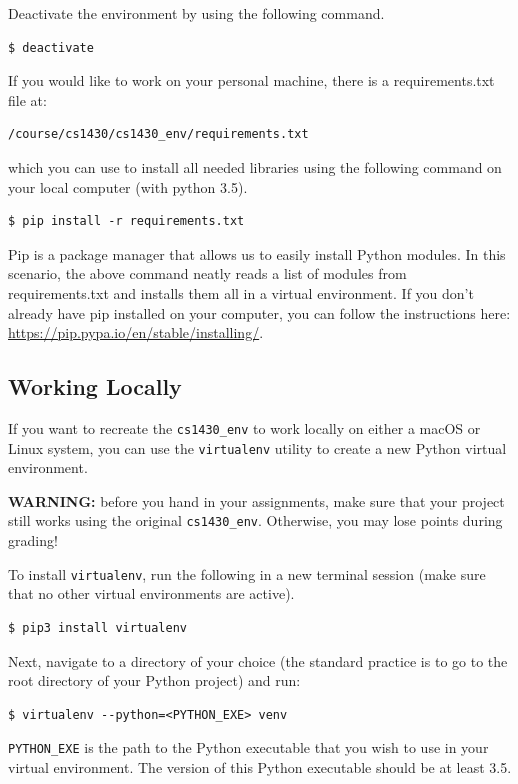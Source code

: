 \documentclass{article}
\begin{document}
Deactivate the environment by using the following command. 
\begin{verbatim}
$ deactivate
\end{verbatim}

If you would like to work on your personal machine, there is a requirements.txt file at: 
\begin{verbatim}
/course/cs1430/cs1430_env/requirements.txt
\end{verbatim} 
which you can use to install all needed libraries using the following command on your local computer (with python 3.5). 
\begin{verbatim}
$ pip install -r requirements.txt
\end{verbatim}

Pip is a package manager that allows us to easily install Python modules. In this scenario, the above command neatly reads a list of modules from requirements.txt and installs them all in a virtual environment. If you don't already have pip installed on your computer, you can follow the instructions here: \href{https://pip.pypa.io/en/stable/installing/}{https://pip.pypa.io/en/stable/installing/}.

\subsection{Working Locally}
If you want to recreate the \texttt{cs1430\_env} to work locally on either a macOS or Linux system, you can use the \texttt{virtualenv} utility to create a new Python virtual environment.

\textbf{WARNING:} before you hand in your assignments, make sure that your project still works using the original \texttt{cs1430\_env}. Otherwise, you may lose points during grading!

To install \texttt{virtualenv}, run the following in a new terminal session (make sure that no other virtual environments are active).
\begin{verbatim}
$ pip3 install virtualenv
\end{verbatim}

Next, navigate to a directory of your choice (the standard practice is to go to the root directory of your Python project) and run:
\begin{verbatim}
$ virtualenv --python=<PYTHON_EXE> venv
\end{verbatim}

\texttt{PYTHON\_EXE} is the path to the Python executable that you wish to use in your virtual environment. The version of this Python executable should be at least 3.5.
\end{document}
